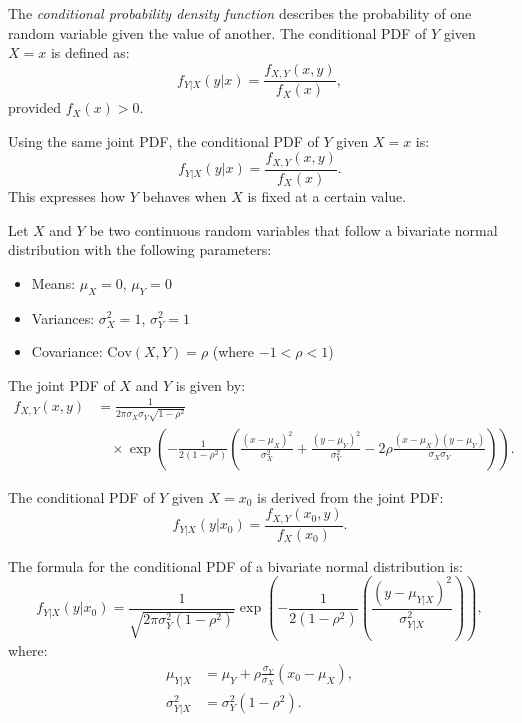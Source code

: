 \begin{definition}
    The \textit{conditional probability density function} describes the probability of one random variable given the value of another. The conditional PDF of \( Y \) given \( X = x \) is defined as:
\[
f_{Y|X}(y|x) = \frac{f_{X,Y}(x,y)}{f_X(x)},
\]
provided \( f_X(x) > 0 \).
\end{definition}

Using the same joint PDF, the conditional PDF of \( Y \) given \( X = x \) is:
\[
f_{Y|X}(y|x) = \frac{f_{X,Y}(x,y)}{f_X(x)}.
\]
This expresses how \( Y \) behaves when \( X \) is fixed at a certain value.\\

\begin{example}
    Let \( X \) and \( Y \) be two continuous random variables that follow a bivariate normal distribution with the following parameters:
\begin{itemize}
    \item Means: \( \mu_X = 0 \), \( \mu_Y = 0 \)
    \item Variances: \( \sigma_X^2 = 1 \), \( \sigma_Y^2 = 1 \)
    \item Covariance: \( \text{Cov}(X, Y) = \rho \) (where \( -1 < \rho < 1 \))
\end{itemize}

The joint PDF of \( X \) and \( Y \) is given by:
\begin{align*}
    f_{X,Y}(x,y) &= \frac{1}{2\pi \sigma_X \sigma_Y \sqrt{1 - \rho^2}} \\
    &\quad \times \exp\left(-\frac{1}{2(1 - \rho^2)} \left(\frac{(x - \mu_X)^2}{\sigma_X^2} + \frac{(y - \mu_Y)^2}{\sigma_Y^2} - 2\rho \frac{(x - \mu_X)(y - \mu_Y)}{\sigma_X \sigma_Y}\right)\right).
    \end{align*}
    
The conditional PDF of \( Y \) given \( X = x_0 \) is derived from the joint PDF:
\[
f_{Y|X}(y|x_0) = \frac{f_{X,Y}(x_0, y)}{f_X(x_0)}.
\]

The formula for the conditional PDF of a bivariate normal distribution is:
\[
f_{Y|X}(y|x_0) = \frac{1}{\sqrt{2\pi \sigma_Y^2 (1 - \rho^2)}} \exp\left(-\frac{1}{2(1 - \rho^2)} \left(\frac{(y - \mu_{Y|X})^2}{\sigma_{Y|X}^2}\right)\right),
\]
where:
\begin{align*}
\mu_{Y|X} &= \mu_Y + \rho \frac{\sigma_Y}{\sigma_X}(x_0 - \mu_X), \\
\sigma_{Y|X}^2 &= \sigma_Y^2 (1 - \rho^2).
\end{align*}


\end{example}
